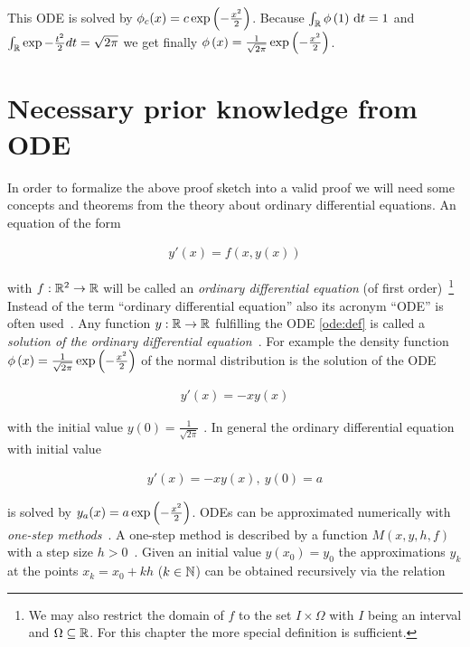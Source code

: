 This ODE is solved by $\phi_c(x) = c \exp\left( {-\frac{x^2}2} \right)$. Because $\int_\mathbb R \phi\left( {1} \right) \,\mathrm d{t} = 1$ and $\int_\mathbb R \exp{-\frac{t^2}2} d{t} = \sqrt{2\pi}$ we get finally $\phi\left( {x} \right) = \frac{1}{\sqrt{2\pi}} \exp\left( {-\frac{x^2}2} \right)$.

\section{Necessary prior knowledge from ODE}

In order to formalize the above proof sketch into a valid proof we will need some concepts and theorems from the theory about ordinary differential equations. An equation of the form

\begin{align} \label{ode:def}
  y'(x) = f(x,y(x))
\end{align}

with $f:\mathbb R^2 \to \mathbb R$ will be called an \emph{ordinary differential equation} (of first order)~\cite[p. 465]{stoer}\cite{wiki:ode}\footnote{We may also restrict the domain of $f$ to the set $I\times \Omega$ with $I$ being an interval and $\Omega\subseteq \mathbb R$. For this chapter the more special definition is sufficient.} Instead of the term ``ordinary differential equation'' also its acronym ``ODE'' is often used~\cite[p. 2]{ricardo}\cite{wiki:ode}. Any function $y:\mathbb R\to\mathbb R$ fulfilling the ODE \eqref{ode:def} is called a \emph{solution of the ordinary differential equation}~\cite[p. 8]{ricardo}\cite{wiki:ode}. For example the density function $\phi\left( {x} \right) = \frac{1}{\sqrt{2\pi}} \exp\left( {-\frac{x^2}2} \right)$ of the normal distribution is the solution of the ODE

\begin{align}
  y'(x) = -xy(x)
\end{align}

with the initial value $y(0) = \frac{1}{\sqrt{2\pi}}$ . In general the ordinary differential equation with initial value

\begin{align}
  y'(x) = -xy(x),\ y(0)=a
\end{align}

is solved by $y_a(x) = a \exp\left( {-\frac{x^2}2} \right)$. ODEs can be approximated numerically with \emph{one-step methods}~\cite[pp.~471~ff]{stoer}. A one-step method is described by a function $M(x,y,h,f)$ with a step size $h>0$~\cite[p.~473]{stoer}. Given an initial value $y(x_0)=y_0$ the approximations $y_k$ at the points $x_k = x_0 + kh$ ($k\in\mathbb N$) can be obtained recursively via the relation

